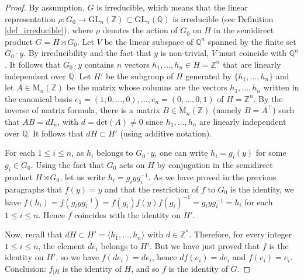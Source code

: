 \documentclass[a4paper, 11pt]{amsart}
\theoremstyle{definition}
\theoremstyle{remark}
\renewcommand{\leq}{\leqslant}
\begin{document}
\begin{proof}
\smallskip \noindent
By assumption, $G$ is irreducible, which means that the linear representation $\rho : G_0\rightarrow \mathrm{GL}_n(\mathbb{Z})\subset \mathrm{GL}_n(\mathbb{Q})$ is irreducible (see Definition \ref{def_irreducible}), where $\rho$ denotes the action of $G_0$ on $H$ in the semidirect product $G=H\rtimes G_0$.  Let $V$ be the linear subspace of $\mathbb{Q}^n$ spanned by the finite set $G_0\cdot y$. By irreducibility and the fact that $y$ is non-trivial, $V$ must coincide with $\mathbb{Q}^n$. It follows that $G_0\cdot y$ contains $n$ vectors $h_1,\ldots, h_n\in H=\mathbb{Z}^n$ that are linearly independent over $\mathbb{Q}$. Let $H'$ be the subgroup of $H$ generated by $\lbrace h_1,\ldots, h_n\rbrace$ and let $A\in \mathrm{M}_n(\mathbb{Z})$ be the matrix whose columns are the vectors $h_1,\ldots,h_n$ written in the canonical basis $e_1=(1,0,\ldots,0),\ldots,e_n=(0,\ldots,0,1)$ of $H=\mathbb{Z}^n$. By the inverse of matrix formula, there is a matrix $B\in \mathrm{M}_n(\mathbb{Z})$ (namely $B=A^\intercal$) such that $AB=dI_n$, with $d=\mathrm{det}(A)\neq 0$ since $h_1,\ldots, h_n$ are linearly independent over $\mathbb{Q}$. It follows that $dH\subset H'$ (using additive notation).



\smallskip \noindent
For each $1\leq i\leq n$, as $h_i$ belongs to $G_0\cdot y$, one can write $h_i=g_i(y)$ for some $g_i\in G_0$. Using the fact that $G_0$ acts on $H$ by conjugation in the semidirect product $H\rtimes G_0$, let us write $h_i=g_iyg_i^{-1}$. As we have proved in the previous paragraphs that $f(y)=y$ and that the restriction of $f$ to $G_0$ is the identity, we have $f(h_i)=f(g_iyg_i^{-1})=f(g_i)f(y)f(g_i)^{-1}=g_iyg_i^{-1}=h_i$ for each $1\leq i\leq n$. Hence $f$ coincides with the identity on $H'$.

\smallskip \noindent
Now, recall that $dH\subset H'=\langle h_1,\ldots,h_n\rangle$ with $d\in\mathbb{Z}^{\ast}$. Therefore, for every integer $1\leq i\leq n$, the element $de_i$ belongs to $H'$. But we have just proved that $f$ is the identity on $H'$, so we have $f(de_i)=de_i$, hence $df(e_i)=de_i$ and $f(e_i)=e_i$. Conclusion: $f_{\vert H}$ is the identity of $H$, and so $f$ is the identity of $G$.\end{proof}
\end{document}

